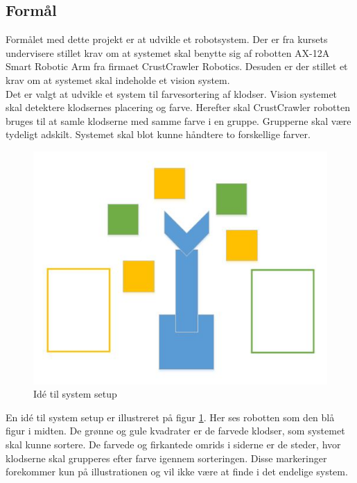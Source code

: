 \subsection{Formål}

Formålet med dette projekt er at udvikle et robotsystem.
Der er fra kursets undervisere stillet krav om at systemet skal benytte sig af robotten AX-12A Smart Robotic Arm fra firmaet CrustCrawler Robotics.
Desuden er der stillet et krav om at systemet skal indeholde et vision system. \\

Det er valgt at udvikle et system til farvesortering af klodser.
Vision systemet skal detektere klodsernes placering og farve.
Herefter skal CrustCrawler robotten bruges til at samle klodserne med samme farve i en gruppe.
Grupperne skal være tydeligt adskilt.
Systemet skal blot kunne håndtere to forskellige farver. \\

\begin{figure}[h]
\centering
\includegraphics[scale=0.65]{images/purpose}
\caption{Idé til system setup}
\label{fig:purpose}
\end{figure}

En idé til system setup er illustreret på figur \ref{fig:purpose}.
Her ses robotten som den blå figur i midten. De grønne og gule kvadrater er de farvede klodser, som systemet skal kunne sortere. 
De farvede og firkantede omrids i siderne er de steder, hvor klodserne skal grupperes efter farve igennem sorteringen.
Disse markeringer forekommer kun på illustrationen og vil ikke være at finde i det endelige system. \\